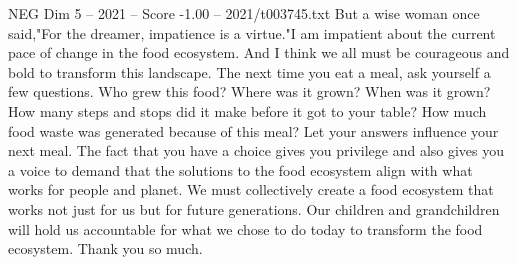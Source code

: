 \begin{textsample}{NEG Dim 5 – 2021 – Score -1.00 – 2021/t003745.txt}
But a wise woman once said,"For the dreamer, impatience is a virtue."I am impatient about the current pace of change in the food ecosystem.
And I think we all must be courageous and bold to transform this landscape.
The next time you eat a meal, ask yourself a few questions.
Who grew this food?
Where was it grown?
When was it grown?
How many steps and stops did it make before it got to your table?
How much food waste was generated because of this meal?
Let your answers influence your next meal.
The fact that you have a choice gives you privilege and also gives you a voice to demand that the solutions to the food ecosystem align with what works for people and planet.
We must collectively create a food ecosystem that works not just for us but for future generations.
Our children and grandchildren will hold us accountable for what we chose to do today to transform the food ecosystem.
Thank you so much.

\end{textsample}
